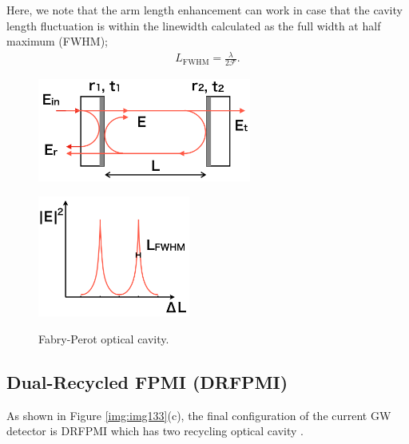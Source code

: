 Here, we note that the arm length enhancement can work in case that the cavity length fluctuation is within the linewidth calculated as the full width at half maximum (FWHM);
\begin{eqnarray}
  L_{\mathrm{FWHM}} = \frac{\lambda}{2\mathcal{F}}\label{eq:eq131}.
\end{eqnarray}


\begin{figure}[h]
  \begin{minipage}[b]{0.5\hsize}
    \begin{center}   
      \includegraphics[width=7cm]{./img_chap1/img133a.png}
       \label{img:img133a}
    \end{center}
  \end{minipage}\hspace{3pt}
  \begin{minipage}[b]{0.5\hsize}
    \begin{center}   
      \includegraphics[width=5cm]{./img_chap1/img133b.png}
       \label{img:img133b}
    \end{center}    
  \end{minipage}
  \caption{Fabry-Perot optical cavity.}
\end{figure}


\subsection{Dual-Recycled FPMI (DRFPMI)}
As shown in Figure \ref{img:img133}(c), the final configuration of the current GW detector is DRFPMI which has two recycling optical cavity \cite{meers1988recycling}.

